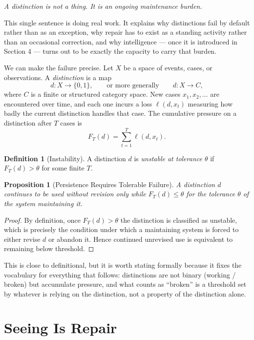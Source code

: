 \documentclass[11pt]{article}
\theoremstyle{plain}
\newtheorem{proposition}[theorem]{Proposition}
\theoremstyle{definition}
\newtheorem{definition}[theorem]{Definition}
\theoremstyle{remark}
\begin{document}
\begin{center}
\emph{A distinction is not a thing. It is an ongoing maintenance burden.}
\end{center}

\noindent This single sentence is doing real work. It explains why distinctions fail by default rather than as an exception, why repair has to exist as a standing activity rather than an occasional correction, and why intelligence --- once it is introduced in Section 4 --- turns out to be exactly the capacity to carry that burden.

We can make the failure precise. Let $X$ be a space of events, cases, or observations. A \emph{distinction} is a map
\[
d : X \to \{0,1\}, \qquad \text{or more generally} \qquad d : X \to C,
\]
where $C$ is a finite or structured category space. New cases $x_1, x_2, \dots$ are encountered over time, and each one incurs a loss $\ell(d, x_t)$ measuring how badly the current distinction handles that case. The cumulative pressure on a distinction after $T$ cases is
\[
F_T(d) = \sum_{t=1}^{T} \ell(d, x_t).
\]

\begin{definition}[Instability]
A distinction $d$ is \emph{unstable at tolerance $\theta$} if $F_T(d) > \theta$ for some finite $T$.
\end{definition}

\begin{proposition}[Persistence Requires Tolerable Failure]
A distinction $d$ continues to be used without revision only while $F_T(d) \le \theta$ for the tolerance $\theta$ of the system maintaining it.
\end{proposition}

\begin{proof}
By definition, once $F_T(d) > \theta$ the distinction is classified as unstable, which is precisely the condition under which a maintaining system is forced to either revise $d$ or abandon it. Hence continued unrevised use is equivalent to remaining below threshold.
\end{proof}

This is close to definitional, but it is worth stating formally because it fixes the vocabulary for everything that follows: distinctions are not binary (working / broken) but accumulate pressure, and what counts as ``broken'' is a threshold set by whatever is relying on the distinction, not a property of the distinction alone.

\section{Seeing Is Repair}
\end{document}
